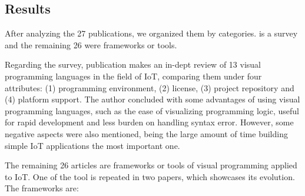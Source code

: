 \subsection{Results}\label{sec:slr_results}

After analyzing the 27 publications, we organized them by categories. \cite{survey_vpl_iot} is a survey and the remaining 26 were frameworks or tools.
\par Regarding the survey, publication \cite{survey_vpl_iot} makes an in-dept review of 13 visual programming languages in the field of IoT, comparing them under four attributes: (1) programming environment, (2) license, (3) project repository and (4) platform support. The author concluded with some advantages of using visual programming languages, such as the ease of visualizing programming logic, useful for rapid development and less burden on handling syntax error. However, some negative aspects were also mentioned, being the large amount of time building simple IoT applications the most important one.
\par The remaining 26 articles are frameworks or tools of visual programming applied to IoT. One of the tool is repeated in two papers, which showcases its evolution. The frameworks are:

